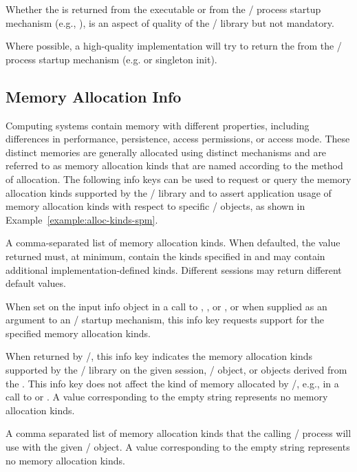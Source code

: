 \begin{users}
Whether the  is returned from the executable or from the
\MPI/ process startup mechanism (e.g., ), is an aspect of quality
of the \MPI/ library but not mandatory.
\end{users}
\begin{implementors}
Where possible, a high-quality implementation will try to return the
 from the \MPI/ process startup mechanism
(e.g.  or singleton init).
\end{implementors}

\subsection{Memory Allocation Info}
\label{subsec:mem_alloc_kinds}

Computing systems contain memory with different properties, including differences in
performance, persistence, access permissions, or access mode.
These distinct memories are generally allocated using distinct mechanisms and are
referred to as memory allocation kinds that are named according to the method of allocation.
The following info keys can be used to request or query the memory allocation
kinds supported by the \MPI/ library and to assert application usage of memory
allocation kinds with respect to specific \MPI/ objects, as shown in Example~\ref{example:alloc-kinds-spm}.

\begin{description}

{\sloppy %
\item[\infokeymain{mpi\_memory\_alloc\_kinds} (string, default: \infovalskip{mpi,system}):]
A comma-separated list of memory allocation kinds. When defaulted, the value returned
must, at minimum, contain the kinds specified in  and may contain
additional implementation-defined kinds. Different sessions may return different default
values.

When set on the input info object in a call to
        ,
        ,
        or ,
or when supplied as an argument to an \MPI/ startup mechanism, this info key
requests support for the specified memory allocation kinds.

}
%
When returned by \MPI/, this info key indicates the memory allocation kinds
supported by the \MPI/ library on the given session, \MPI/ object, or objects
derived from the \wpm{}.
%
This info key does not affect the kind of memory allocated by \MPI/, e.g., in a
call to  or .
%
A value corresponding to the empty string represents no memory allocation kinds.

\item[\infokeymain{mpi\_assert\_memory\_alloc\_kinds} (string, not set by default):]
A comma separated list of memory allocation kinds that the calling \MPI/ process will
use with the given \MPI/ object.
%
A value corresponding to the empty string represents no memory allocation kinds.

\end{description}

